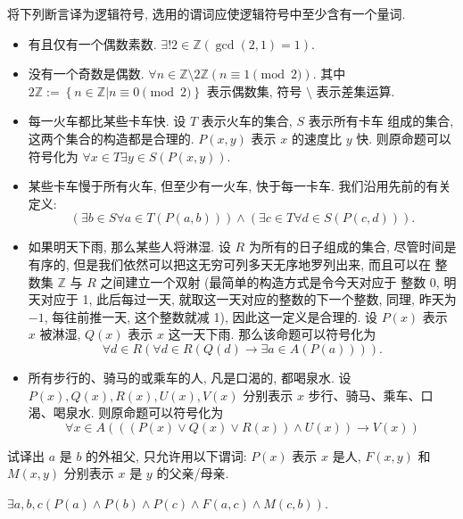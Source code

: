 \documentclass[10pt,UTF8]{book} %
\begin{document}
\begin{exercise}
    将下列断言译为逻辑符号, 选用的谓词应使逻辑符号中至少含有一个量词.
    \begin{itemize}[itemsep=0pt]
        \item {\kaishu 有且仅有一个偶数素数}. $\exists! 2 \in \mathbb{Z} \left(\gcd(2,1)=1\right)$.
        \item {\kaishu 没有一个奇数是偶数}. $\forall n \in \mathbb{Z} \setminus 2\mathbb{Z} \left( n \equiv 1 \pmod 2 \right)$.
        其中 $2\mathbb{Z} := \left\{ n \in \mathbb{Z} | n \equiv 0 \pmod 2 \right\}$ 表示偶数集,
        符号 $\setminus$ 表示差集运算.
        \item {\kaishu 每一火车都比某些卡车快}. 设 $T$ 表示火车的集合, $S$ 表示所有卡车
        组成的集合, 这两个集合的构造都是合理的. $P(x,y)$ 表示 $x$ 的速度比 $y$ 快.
        则原命题可以符号化为 $\forall x \in T \exists y \in S \left( P(x,y) \right)$.
        \item {\kaishu 某些卡车慢于所有火车, 但至少有一火车, 快于每一卡车}.
        我们沿用先前的有关定义:
        \[ \left(\exists b \in S \forall a \in T (P(a,b))\right)
        \wedge \left(
            \exists c \in T \forall d \in S \left( P(c,d) \right)
        \right). \]
        \item {如果明天下雨, 那么某些人将淋湿}. 设 $R$ 为所有的日子组成的集合,
        尽管时间是有序的, 但是我们依然可以把这无穷可列多天无序地罗列出来, 而且可以在
        整数集 $\mathbb{Z}$ 与 $R$ 之间建立一个双射 (最简单的构造方式是令今天对应于
        整数 0, 明天对应于 1, 此后每过一天, 就取这一天对应的整数的下一个整数, 同理,
        昨天为 $-1$, 每往前推一天, 这个整数就减 1), 因此这一定义是合理的.
        设 $P(x)$ 表示 $x$ 被淋湿, $Q(x)$ 表示 $x$ 这一天下雨. 那么该命题可以符号化为
        \[ \forall d \in R \left(
            \forall d \in R \left( Q(d) \to 
            \exists a \in A \left( P(a) \right) \right)
        \right). \]
        \item {所有步行的、骑马的或乘车的人, 凡是口渴的, 都喝泉水}. 设
        $P(x), Q(x), R(x), U(x), V(x)$ 分别表示 $x$ 步行、骑马、乘车、口渴、喝泉水.
        则原命题可以符号化为 
        \[ \forall x \in A \left(
            \left(\left(
                P(x) \vee Q(x) \vee R(x)
            \right) \wedge U(x)\right)
            \to V(x)
        \right) \]
    \end{itemize}
\end{exercise}

\begin{exercise}
    试译出 {\kaishu $a$ 是 $b$ 的外祖父}, 只允许用以下谓词: $P(x)$ 表示 $x$ 是人,
    $F(x,y)$ 和 $M(x,y)$ 分别表示 $x$ 是 $y$ 的父亲/母亲.
    \begin{sol}
        $\exists a,b,c \left(P(a) \wedge P(b) \wedge P(c) \wedge F(a,c) \wedge M(c,b)\right)$.
    \end{sol}
\end{exercise}
\end{document}
